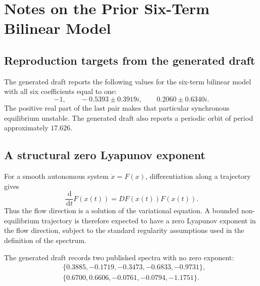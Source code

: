 \documentclass[11pt, reqno]{amsart}
\theoremstyle{definition}
\theoremstyle{remark}
\newcommand{\dd}{\,\mathrm{d}}
\begin{document}
\section{Notes on the Prior Six-Term Bilinear Model}
\label{app:lin-han}

\subsection{Reproduction targets from the generated draft}

The generated draft reports the following values for the six-term bilinear
model with all six coefficients equal to one:
\begin{equation}
\label{eq:reported-bilinear-eigs}
    -1,
    \qquad
    -0.5393\pm0.3919i,
    \qquad
    0.2060\pm0.6340i.
\end{equation}
The positive real part of the last pair makes that particular synchronous
equilibrium unstable.  The generated draft also reports a periodic orbit of
period approximately $17.626$.


\subsection{A structural zero Lyapunov exponent}

For a smooth autonomous system $\dot x=F(x)$, differentiation along a trajectory
gives
\[
    \frac{\dd}{\dd t}F(x(t))
    =
    DF(x(t))F(x(t)).
\]
Thus the flow direction is a solution of the variational equation.  A bounded
non-equilibrium trajectory is therefore expected to have a zero Lyapunov
exponent in the flow direction, subject to the standard regularity assumptions
used in the definition of the spectrum.

The generated draft records two published spectra with no zero exponent:
\begin{equation}
\label{eq:reported-spectra}
\begin{aligned}
    &\{0.3885,-0.1719,-0.3473,-0.6833,-0.9731\},\\
    &\{0.6700,0.6606,-0.0761,-0.0794,-1.1751\}.
\end{aligned}
\end{equation}

\end{document}
